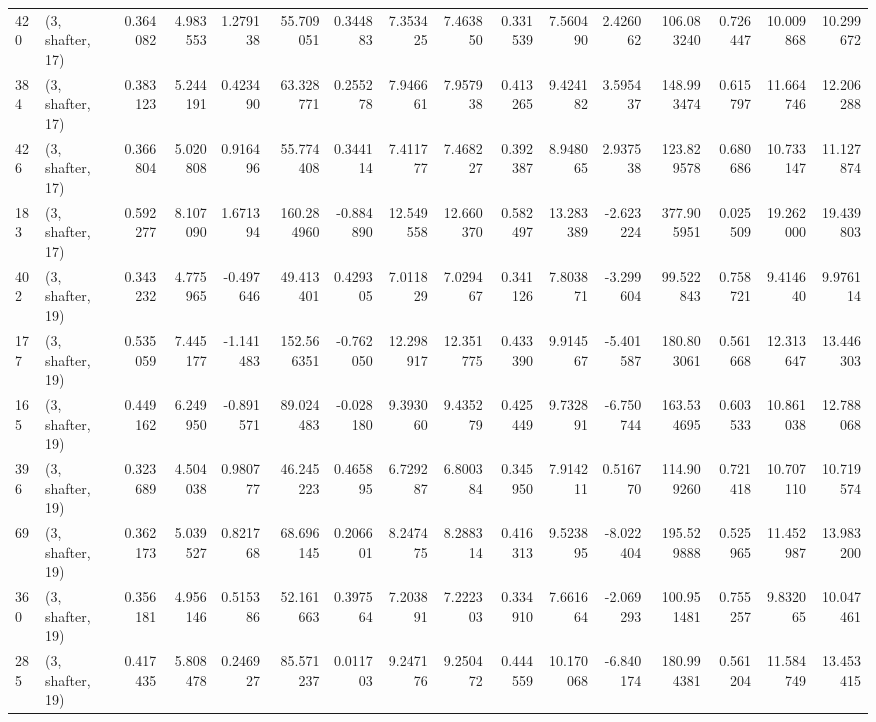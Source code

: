 \begin{tabular}{llrrrrrrrrrrrrrr}
420 &  (3, shafter, 17) &   0.364082 &   4.983553 &   1.279138 &    55.709051 &   0.344883 &   7.353425 &   7.463850 &  0.331539 &   7.560490 &   2.426062 &   106.083240 &  0.726447 &  10.009868 &  10.299672 \\
384 &  (3, shafter, 17) &   0.383123 &   5.244191 &   0.423490 &    63.328771 &   0.255278 &   7.946661 &   7.957938 &  0.413265 &   9.424182 &   3.595437 &   148.993474 &  0.615797 &  11.664746 &  12.206288 \\
426 &  (3, shafter, 17) &   0.366804 &   5.020808 &   0.916496 &    55.774408 &   0.344114 &   7.411777 &   7.468227 &  0.392387 &   8.948065 &   2.937538 &   123.829578 &  0.680686 &  10.733147 &  11.127874 \\
183 &  (3, shafter, 17) &   0.592277 &   8.107090 &   1.671394 &   160.284960 &  -0.884890 &  12.549558 &  12.660370 &  0.582497 &  13.283389 &  -2.623224 &   377.905951 &  0.025509 &  19.262000 &  19.439803 \\
402 &  (3, shafter, 19) &   0.343232 &   4.775965 &  -0.497646 &    49.413401 &   0.429305 &   7.011829 &   7.029467 &  0.341126 &   7.803871 &  -3.299604 &    99.522843 &  0.758721 &   9.414640 &   9.976114 \\
177 &  (3, shafter, 19) &   0.535059 &   7.445177 &  -1.141483 &   152.566351 &  -0.762050 &  12.298917 &  12.351775 &  0.433390 &   9.914567 &  -5.401587 &   180.803061 &  0.561668 &  12.313647 &  13.446303 \\
165 &  (3, shafter, 19) &   0.449162 &   6.249950 &  -0.891571 &    89.024483 &  -0.028180 &   9.393060 &   9.435279 &  0.425449 &   9.732891 &  -6.750744 &   163.534695 &  0.603533 &  10.861038 &  12.788068 \\
396 &  (3, shafter, 19) &   0.323689 &   4.504038 &   0.980777 &    46.245223 &   0.465895 &   6.729287 &   6.800384 &  0.345950 &   7.914211 &   0.516770 &   114.909260 &  0.721418 &  10.707110 &  10.719574 \\
69  &  (3, shafter, 19) &   0.362173 &   5.039527 &   0.821768 &    68.696145 &   0.206601 &   8.247475 &   8.288314 &  0.416313 &   9.523895 &  -8.022404 &   195.529888 &  0.525965 &  11.452987 &  13.983200 \\
360 &  (3, shafter, 19) &   0.356181 &   4.956146 &   0.515386 &    52.161663 &   0.397564 &   7.203891 &   7.222303 &  0.334910 &   7.661664 &  -2.069293 &   100.951481 &  0.755257 &   9.832065 &  10.047461 \\
285 &  (3, shafter, 19) &   0.417435 &   5.808478 &   0.246927 &    85.571237 &   0.011703 &   9.247176 &   9.250472 &  0.444559 &  10.170068 &  -6.840174 &   180.994381 &  0.561204 &  11.584749 &  13.453415 \\

\end{tabular}

